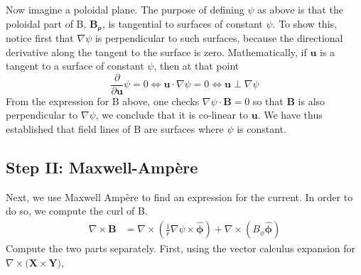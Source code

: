 \documentclass[11pt,a4paper]{article}
\begin{document}
    Now imagine a poloidal plane. The purpose of defining $\psi$ as above is that the poloidal part of B, $\mathbf{B_\rho}$, is tangential to surfaces of constant $\psi$. To show this, notice first that $\nabla\psi$ is perpendicular to such surfaces, because the directional derivative along the tangent to the surface is zero. Mathematically, if $\mathbf{u}$ is a tangent to a surface of constant $\psi$, then at that point 
    $$\frac{\partial}{\partial \mathbf{u}}\psi=0 \iff \mathbf{u} \cdot \nabla\psi=0 \iff \mathbf{u} \perp \nabla\psi$$
    From the expression for B above, one checks $\nabla\psi\cdot\mathbf{B}=0$ so that $\mathbf{B}$ is also perpendicular to $\nabla\psi$, we conclude that it is co-linear to $\mathbf{u}$. We have thus established that field lines of B are surfaces where $\psi$ is constant.

\subsection{Step II: Maxwell-Ampère}
    Next, we use Maxwell Ampère to find an expression for the current. In order to do so, we compute the curl of B.
    $$\begin{aligned}
        \nabla\times\mathbf{B}&=\nabla\times\left(\frac{1}{r}\nabla\psi\times\hat{\boldsymbol{\phi}}\right)+\nabla\times(B_\phi\hat{\boldsymbol{\phi}})    \end{aligned}
    $$
    Compute the two parts separately. First, using the vector calculus expansion for $\nabla\times(\mathbf{X\times\mathbf{Y)}}$, 
\end{document}
